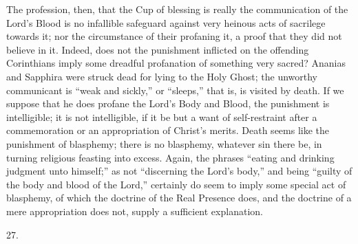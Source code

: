 The profession, then, that the Cup of blessing is
really the communication of the Lord's Blood is no infallible
safeguard against very heinous acts of sacrilege towards it; nor the
circumstance of their profaning it, a proof that they did not believe
in it. Indeed, does not the punishment inflicted on the offending
Corinthians imply some dreadful profanation of something very sacred?
Ananias and Sapphira were struck dead for lying to the Holy Ghost; the
unworthy communicant is ``weak and sickly,'' or ``sleeps,'' that is, is
visited by death. If we suppose that he does profane the Lord's Body
and Blood, the punishment is intelligible; it is not intelligible, if
it be but a want of self-restraint after a commemoration or an
appropriation of Christ's merits. Death seems like the punishment of
blasphemy; there is no blasphemy, whatever sin there be, in turning
religious feasting into excess. Again, the phrases ``eating and
drinking judgment unto himself;'' as not ``discerning the Lord's body,''
and being ``guilty of the body and blood of the Lord,'' certainly do
seem to imply some special act of blasphemy, of which the
doctrine of the Real Presence does, and the doctrine of a mere
appropriation does not, supply a sufficient explanation.

27.

